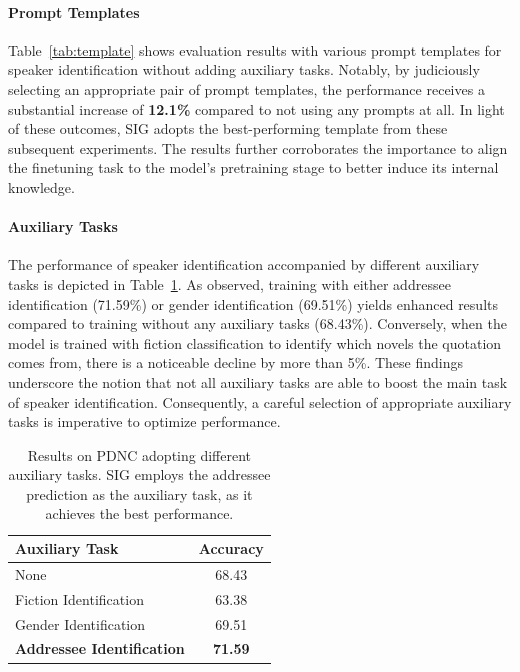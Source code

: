 \documentclass[letterpaper]{article} %
\begin{document}
\paragraph{Prompt Templates}
Table~\ref{tab:template} shows evaluation results with various prompt templates for speaker identification without adding auxiliary tasks.
Notably, by judiciously selecting an appropriate pair of prompt templates, the performance receives a substantial increase of \textbf{12.1\%} compared to not using any prompts at all. In light of these outcomes, SIG adopts the best-performing template from these subsequent experiments. The results further corroborates the importance to align the finetuning task to the model's pretraining stage to better induce its internal knowledge.

\paragraph{Auxiliary Tasks}
The performance of speaker identification accompanied by different auxiliary tasks is depicted in Table~\ref{tab:aux}. As observed, training with either addressee identification (71.59\%) or gender identification (69.51\%) yields enhanced results compared to training without any auxiliary tasks (68.43\%). Conversely, when the model is trained with fiction classification to identify which novels the quotation comes from, there is a noticeable decline by more than 5\%. These findings underscore the notion that not all auxiliary tasks are able to boost the main task of speaker identification. Consequently, a careful selection of appropriate auxiliary tasks is imperative to optimize performance.

\begin{table}[htbp!]
    \centering
    \begin{tabular}{l |c}

       \toprule
       \textbf{Auxiliary Task} &\textbf{Accuracy}\\
       \midrule

       None & 68.43\\
       Fiction Identification & 63.38\\
       Gender Identification  & 69.51\\
       \textbf{Addressee Identification} & \textbf{71.59}\\
       \bottomrule

    \end{tabular}
    \caption{Results on PDNC adopting different auxiliary tasks. SIG employs the addressee prediction as the auxiliary task, as it achieves the best performance.}
    \label{tab:aux}
\end{table}
\end{document}

